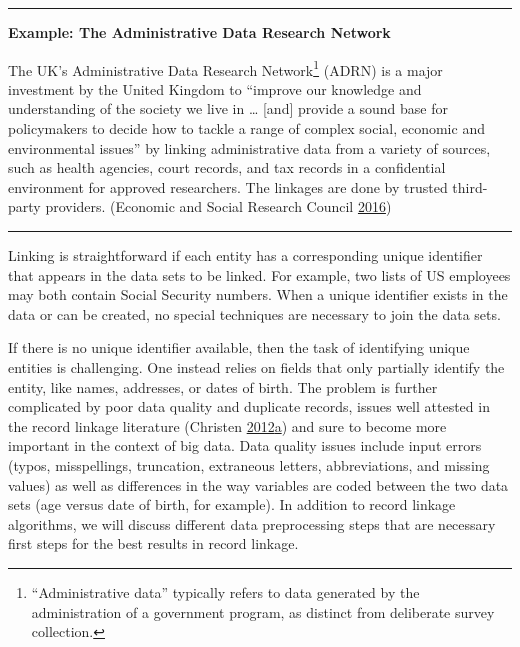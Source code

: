 \documentclass[]{krantz}
\begin{document}
\begin{center}\rule{0.5\linewidth}{\linethickness}\end{center}

\textbf{Example: The Administrative Data Research Network}

The UK's Administrative Data Research Network\footnote{``Administrative
  data'' typically refers to data generated by the administration of a
  government program, as distinct from deliberate survey collection.}
(ADRN) is a major investment by the United Kingdom to ``improve our
knowledge and understanding of the society we live in \ldots{} {[}and{]}
provide a sound base for policymakers to decide how to tackle a range of
complex social, economic and environmental issues'' by linking
administrative data from a variety of sources, such as health agencies,
court records, and tax records in a confidential environment for
approved researchers. The linkages are done by trusted third-party
providers. (Economic and Social Research Council
\protect\hyperlink{ref-EconomicandSocialResearchCouncil2016}{2016})

\begin{center}\rule{0.5\linewidth}{\linethickness}\end{center}

Linking is straightforward if each entity has a corresponding unique
identifier that appears in the data sets to be linked. For example, two
lists of US employees may both contain Social Security numbers. When a
unique identifier exists in the data or can be created, no special
techniques are necessary to join the data sets.

If there is no unique identifier available, then the task of identifying
unique entities is challenging. One instead relies on fields that only
partially identify the entity, like names, addresses, or dates of birth.
The problem is further complicated by poor data quality and duplicate
records, issues well attested in the record linkage literature (Christen
\protect\hyperlink{ref-christen2012survey}{2012}\protect\hyperlink{ref-christen2012survey}{a})
and sure to become more important in the context of big data. Data
quality issues include input errors (typos, misspellings, truncation,
extraneous letters, abbreviations, and missing values) as well as
differences in the way variables are coded between the two data sets
(age versus date of birth, for example). In addition to record linkage
algorithms, we will discuss different data preprocessing steps that are
necessary first steps for the best results in record linkage.
\end{document}
